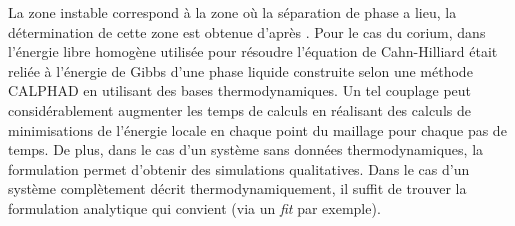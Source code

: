 
La zone instable correspond à la zone où la séparation de phase a lieu, la détermination de cette zone est obtenue d'après \cite{aursand_spinodal_2017}. Pour le cas du corium, dans \cite{cardon_modelisation_2016} l'énergie libre homogène utilisée pour résoudre l'équation de Cahn-Hilliard était reliée à l'énergie de Gibbs d'une phase liquide construite selon une méthode CALPHAD en utilisant des bases thermodynamiques. Un tel couplage peut considérablement augmenter les temps de calculs en réalisant des calculs de minimisations de l'énergie locale en chaque point du maillage pour chaque pas de temps. De plus, dans le cas d'un système sans données thermodynamiques, la formulation permet d'obtenir des simulations qualitatives. Dans le cas d'un système complètement décrit thermodynamiquement, il suffit de trouver la formulation analytique qui convient \cite{verdier_phase-field_2022} (via un \textit{fit} par exemple). 


